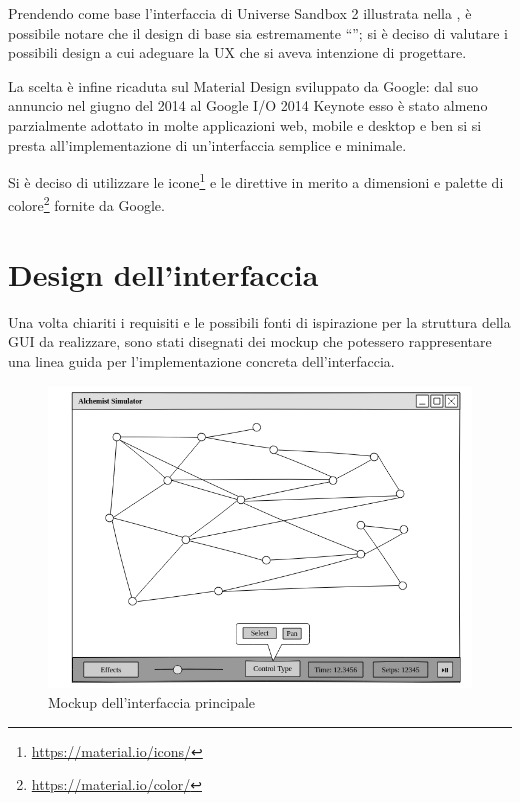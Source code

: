             Prendendo come base l'interfaccia di Universe Sandbox 2 illustrata nella , è possibile notare che il design di base sia estremamente ``'';
            si è deciso di valutare i possibili design a cui adeguare la UX che si aveva intenzione di progettare.

            La scelta è infine ricaduta sul Material Design sviluppato da Google:
            dal suo annuncio nel giugno del 2014 al Google I/O 2014 Keynote esso è stato almeno parzialmente adottato in molte applicazioni web, mobile e desktop e ben si si presta all'implementazione di un'interfaccia semplice e minimale.

            Si è deciso di utilizzare le icone\footnote{\url{https://material.io/icons/}} e le direttive in merito a dimensioni e palette di colore\footnote{\url{https://material.io/color/}} fornite da Google.

    \section{Design dell'interfaccia}\label{sec:design}
        Una volta chiariti i requisiti e le possibili fonti di ispirazione per la struttura della GUI da realizzare, sono stati disegnati dei mockup che potessero rappresentare una linea guida per l'implementazione concreta dell'interfaccia.

        \begin{figure}[htbp]
            \centering
            \includegraphics[scale=0.5]{img/withNodes/main_window}
            \caption{Mockup dell'interfaccia principale}
            \label{fig:mock:mainWindow}
        \end{figure}

